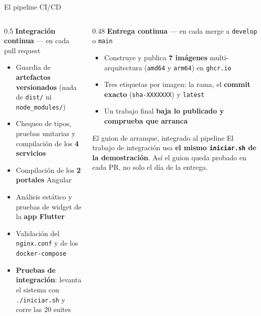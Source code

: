 \documentclass[aspectratio=169,10pt,xcolor={table}]{beamer}
\begin{document}
\begin{frame}{El pipeline CI/CD}
  \scriptsize
  \begin{columns}[T]
    \begin{column}{0.5\textwidth}
      \textbf{Integración continua} --- en cada pull request
      \begin{itemize}\scriptsize
        \item Guardia de \textbf{artefactos versionados} (nada de \texttt{dist/} ni
              \texttt{node\_modules/})
        \item Chequeo de tipos, pruebas unitarias y compilación de los \textbf{4 servicios}
        \item Compilación de los \textbf{2 portales} Angular
        \item Análisis estático y pruebas de widget de la \textbf{app Flutter}
        \item Validación del \texttt{nginx.conf} y de los \texttt{docker-compose}
        \item \textbf{Pruebas de integración}: levanta el sistema con
              \texttt{./iniciar.sh} y corre las 20 suites
      \end{itemize}
    \end{column}
    \begin{column}{0.48\textwidth}
      \textbf{Entrega continua} --- en cada merge a \texttt{develop} o \texttt{main}
      \begin{itemize}\scriptsize
        \item Construye y publica \textbf{7 imágenes} multi-arquitectura
              (\texttt{amd64} y \texttt{arm64}) en \texttt{ghcr.io}
        \item Tres etiquetas por imagen: la rama, el \textbf{commit exacto}
              (\texttt{sha-XXXXXXX}) y \texttt{latest}
        \item Un trabajo final \textbf{baja lo publicado y comprueba que arranca}
      \end{itemize}
      \vspace{0.4em}
      \begin{block}{El guion de arranque, integrado al pipeline}
        \scriptsize El trabajo de integración usa \textbf{el mismo \texttt{iniciar.sh} de la
        demostración}. Así el guion queda probado en cada PR, no solo el día de la entrega.
      \end{block}
    \end{column}
  \end{columns}
\end{frame}
\end{document}
